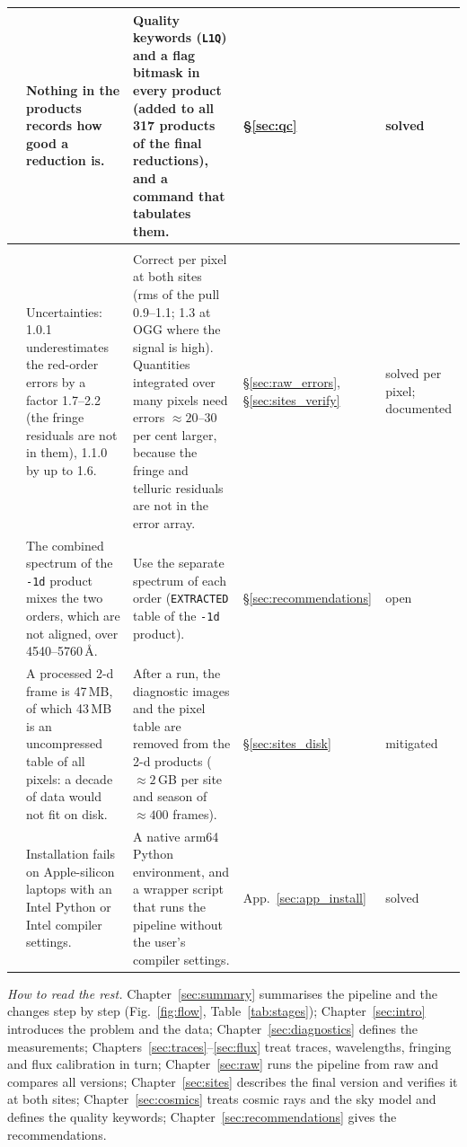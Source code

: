 {\begin{longtable}{@{}>{\raggedright\arraybackslash}p{0.3cm}>{\raggedright\arraybackslash}p{5.4cm}>{\raggedright\arraybackslash}p{5.3cm}>{\raggedright\arraybackslash}p{1.6cm}>{\raggedright\arraybackslash}p{1.9cm}@{}}
32 & Nothing in the products records how good a reduction is. & Quality keywords (\texttt{L1Q}) and a flag bitmask
in every product
(added to all 317 products of the final reductions), and a command that tabulates them. & \S\ref{sec:qc} & solved \\
\midrule
\multicolumn{5}{@{}l}{\textit{Uncertainties and products}}\\
23 & Uncertainties: 1.0.1 underestimates the red-order errors by a factor 1.7--2.2 (the fringe residuals are not in
them), 1.1.0 by up to 1.6. & Correct per pixel at both sites (rms of the pull 0.9--1.1; 1.3 at OGG where the signal is
high). Quantities integrated over many pixels need errors $\approx20$--30 per cent larger, because the fringe and
telluric residuals are not in the error array. & \S\ref{sec:raw_errors},
\S\ref{sec:sites_verify} & solved per pixel; documented \\
24 & The combined spectrum of the \texttt{-1d} product mixes the two orders, which are not aligned, over
4540--5760\,\AA. & Use the separate spectrum of each order (\texttt{EXTRACTED} table of the \texttt{-1d} product). & \S\ref{sec:recommendations} & open \\
25 & A processed 2-d frame is 47\,MB, of which 43\,MB is an uncompressed table of all pixels: a decade of data
would not fit on disk. & After a run, the diagnostic images and the pixel table are removed from the 2-d products
($\approx2$\,GB per site and season of $\approx400$ frames). & \S\ref{sec:sites_disk} & mitigated \\
26 & Installation fails on Apple-silicon laptops with an Intel Python or Intel compiler settings. & A native arm64 Python
environment, and a wrapper script that runs the pipeline without the user's compiler settings. & App.~\ref{sec:app_install} & solved \\
\end{longtable}
}

\textit{How to read the rest.} Chapter~\ref{sec:summary} summarises the pipeline and the changes step by step
(Fig.~\ref{fig:flow}, Table~\ref{tab:stages}); Chapter~\ref{sec:intro} introduces the problem and the data;
Chapter~\ref{sec:diagnostics} defines the measurements;
Chapters~\ref{sec:traces}--\ref{sec:flux} treat traces, wavelengths, fringing and flux calibration in turn;
Chapter~\ref{sec:raw} runs the pipeline from raw and compares all versions; Chapter~\ref{sec:sites} describes the final
version and verifies it at both sites; Chapter~\ref{sec:cosmics} treats cosmic rays and the sky model and defines the
quality keywords; Chapter~\ref{sec:recommendations} gives the recommendations.
